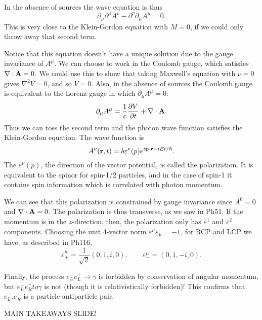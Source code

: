 \documentclass[../p164main.tex]{subfiles}
\begin{document}
In the absence of sources the wave equation is thus
\[ \partial_\mu \partial^\mu A^\nu - \partial^\nu \partial_\mu A^\mu = 0.  \]
This is very close to the Klein-Gordon equation with $M = 0$, if we could only throw away that second term.

Notice that this equation doesn't have a unique solution due to the gauge invariance of $A^\mu$.
We can choose to work in the Coulomb gauge, which satisfies $\nabla \cdot \mathbf{A} = 0$.
We could use this to show that taking Maxwell's equation with $\nu = 0$ gives $\nabla^2 V = 0$, and so $V = 0$. %
Also, in the absence of sources the Coulomb gauge is equivalent to the Lorenz gauge in which $\partial_\mu A^\mu = 0$:
\[ \partial_\mu A^\mu = \frac{1}{c} \frac{\partial V}{\partial t} + \nabla \cdot \mathbf{A}. \]
Thus we can toss the second term and the photon wave function satisfies the Klein-Gordon equation.  %
The wave function is
\[ A^\nu(\mathbf{r}, t) = b \varepsilon^\nu(p) e^{i \mathbf{p} \cdot \mathbf{r} - iEt / \hbar}. \]
The $\varepsilon^\nu(p)$, the direction of the vector potential, is called the polarization.
It is equivalent to the spinor for spin-1/2 particles, and in the case of spin-1 it contains spin information which is correlated with photon momentum.

We can see that this polarization is constrained by gauge invariance since $A^0 = 0$ and $\nabla \cdot \mathbf{A} = 0$.
The polarization is thus transverse, as we saw in Ph51.
If the momentum is in the $z$-direction, then, the polarization only has $\varepsilon^1$ and $\varepsilon^2$ components.
Choosing the unit 4-vector norm $\varepsilon^\mu \varepsilon_\mu = -1$, for RCP and LCP we have, as described in Ph116,     %
\[ \varepsilon^\mu_+ = \frac{1}{\sqrt{2}} (0, 1, i, 0), \qquad \varepsilon_-^\mu = (0, 1, -i, 0). \]

Finally, the process $e_L^- e_L^+ \to \gamma$ is forbidden by conservation of angular momentum, but $e_L^- e_R^+ 
to \gamma$ is not (though it is relativistically forbidden)!
This confirms that $e_L^-. e_R^+$ is a particle-antiparticle pair.

MAIN TAKEAWAYS SLIDE!







\end{document}
